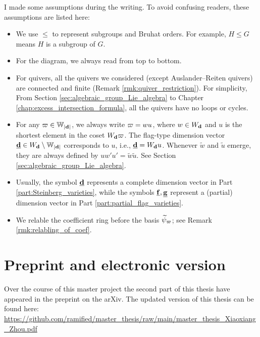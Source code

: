 \begin{warning}
I made some assumptions during the writing. To avoid confusing readers, these assumptions are listed here:
\begingroup
{}
\begin{itemize}
\item We use $\leqslant$ to represent subgroups and Bruhat orders. For example, $H \leqslant G$ means $H$ is a subgroup of $G$.

\item For the diagram, we always read from top to bottom.

\item For quivers, all the quivers we considered (except Auslander--Reiten quivers) are connected and finite (Remark \ref{rmk:quiver_restriction}). For simplicity, From Section \ref{sec:algebraic_group_Lie_algebra} to Chapter \ref{chap:excess_intersection_formula}, all the quivers have no loops or cycles.

\item  For any $\varpi \in \mathbb{W}_{|\mathbf{d}|}$, we always write $\varpi = wu$, where $w \in W_{\mathbf{d}}$ and $u$ is the shortest element in the coset $W_{\mathbf{d}} \varpi$. The flag-type dimension vector $\underline{\mathbf{d}} \in W_{\mathbf{d}} \setminus \mathbb{W}_{|\mathbf{d}|}$ corresponds to $u$, i.e., $\underline{\mathbf{d}}=W_{\mathbf{d}} u$. Whenever $\tilde{w}$ and $\tilde{u}$ emerge, they are always defined by $uw'u'=\tilde{w}\tilde{u}$. See Section \ref{sec:algebraic_group_Lie_algebra}. 

\item Usually, the symbol $\underline{\mathbf{d}}$ represents a complete   dimension vector in Part \ref{part:Steinberg_varieties}, while the symbols $\underline{\mathbf{f}}, \underline{\mathbf{g}}$ represent a (partial) dimension vector in Part \ref{part:partial_flag_varieties}.

\item We relable the coefficient ring before the basis $\widetilde{\psi}_{\varpi}$; see Remark \ref{rmk:relabling_of_coef}.
\end{itemize}
\endgroup
\end{warning}

\section*{Preprint and electronic version}
Over the course of this master project the second part of this thesis have appeared in the preprint \cite{zhou2022affine} on the arXiv. The updated version of this thesis can be found here:  \href{https://github.com/ramified/master_thesis/raw/main/master_thesis_Xiaoxiang_Zhou.pdf}{https://github.com/ramified/master\_thesis/raw/main/master\_thesis\_Xiaoxiang\_Zhou.pdf}